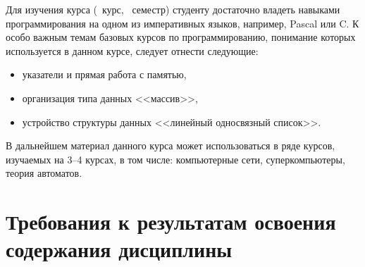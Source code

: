 	\ssect %
Для изучения курса \thecourse{} (\theyearofstudy~курс, \theterm~семестр)
студенту достаточно владеть навыками программирования на одном из императивных языков, например, Pascal или C. К особо важным темам базовых курсов по программированию, понимание которых используется в данном курсе, следует отнести следующие:
\begin{itemize}
	\item указатели и прямая работа с памятью,
	\item организация типа данных <<массив>>,
	\item устройство структуры данных <<линейный односвязный список>>.
\end{itemize}

	\ssect
В дальнейшем материал данного курса может использоваться в ряде курсов,
изучаемых на 3--4 курсах, в том числе: компьютерные сети, суперкомпьютеры, теория автоматов.

\section{Требования к результатам освоения содержания дисциплины}

